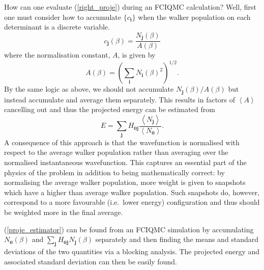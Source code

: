 \documentclass[a4paper, 12pt]{revtex4}
\newcommand{\bi}{\mathbf{i}}
\newcommand{\bj}{\mathbf{j}}
\newcommand{\bz}{\mathbf{0}}
\newcommand{\eref}[1]{(\ref{#1})}
\newcommand{\av}[1]{\left\langle#1\right\rangle}
\begin{document}
How can one evaluate \eref{right_proje} during an FCIQMC calculation?  Well, first one must consider how to accumulate $\{c_\bi\}$ when the walker population on each determinant is a discrete variable.
\begin{equation}
c_\bj(\beta) = \frac{N_\bj(\beta)}{A(\beta)}
\end{equation}
where the normalisation constant, $A$, is given by
\begin{equation}
A(\beta) = \left( \sum_\bi N_\bi(\beta)^2 \right)^{1/2}.
\end{equation}
By the same logic as above, we should not accumulate $N_\bj(\beta)/A(\beta)$ but instead accumulate and average them separately.  This results in factors of $\av{A}$ cancelling out and thus the projected energy can be estimated from
\begin{equation}
\label{proje_estimator}
E = \sum_\bj H_{\bz\bj} \frac{\av{N_\bj}}{\av{N_\bz}}.
\end{equation}
A consequence of this approach is that the wavefunction is normalised with respect to the average walker population rather than averaging over the normalised instantaneous wavefunction.  This captures an essential part of the physics of the problem in addition to being mathematically correct: by normalising the average walker population, more weight is given to snapshots which have a higher than average walker population.  Such snapshots do, however, correspond to a more favourable (i.e.\ lower energy) configuration and thus should be weighted more in the final average.

\eref{proje_estimator} can be found from an FCIQMC simulation by accumulating $N_\bz(\beta)$ and $\sum_\bj H_{\bz\bj} N_\bj(\beta)$ separately and then finding the means and standard deviations of the two quantities via a blocking analysis.  The projected energy and associated standard deviation can then be easily found.
\end{document}
